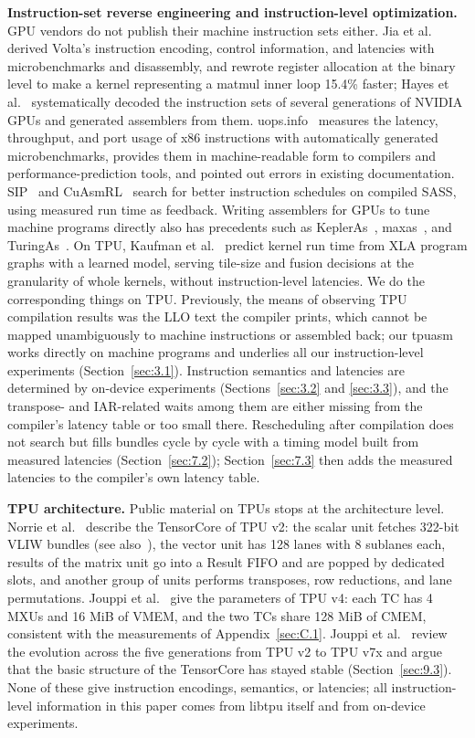 \documentclass[sigconf,nonacm,balance=false]{acmart}
\begin{document}
\textbf{Instruction-set reverse engineering and instruction-level optimization.} GPU vendors do not publish their machine instruction sets either. Jia et al.~\cite{jia2018volta} derived Volta's instruction encoding, control information, and latencies with microbenchmarks and disassembly, and rewrote register allocation at the binary level to make a kernel representing a matmul inner loop 15.4\% faster; Hayes et al.~\cite{hayes2019decoding} systematically decoded the instruction sets of several generations of NVIDIA GPUs and generated assemblers from them. uops.info~\cite{abel2019uops} measures the latency, throughput, and port usage of x86 instructions with automatically generated microbenchmarks, provides them in machine-readable form to compilers and performance-prediction tools, and pointed out errors in existing documentation. SIP~\cite{he2024sip} and CuAsmRL~\cite{he2025cuasmrl} search for better instruction schedules on compiled SASS, using measured run time as feedback. Writing assemblers for GPUs to tune machine programs directly also has precedents such as KeplerAs~\cite{zhang2017kepleras}, maxas~\cite{maxas}, and TuringAs~\cite{turingas}. On TPU, Kaufman et al.~\cite{kaufman2021} predict kernel run time from XLA program graphs with a learned model, serving tile-size and fusion decisions at the granularity of whole kernels, without instruction-level latencies. We do the corresponding things on TPU. Previously, the means of observing TPU compilation results was the LLO text the compiler prints, which cannot be mapped unambiguously to machine instructions or assembled back; our tpuasm~\cite{tpuasm} works directly on machine programs and underlies all our instruction-level experiments (Section~\ref{sec:3.1}). Instruction semantics and latencies are determined by on-device experiments (Sections~\ref{sec:3.2} and \ref{sec:3.3}), and the transpose- and IAR-related waits among them are either missing from the compiler's latency table or too small there. Rescheduling after compilation does not search but fills bundles cycle by cycle with a timing model built from measured latencies (Section~\ref{sec:7.2}); Section~\ref{sec:7.3} then adds the measured latencies to the compiler's own latency table.

\textbf{TPU architecture.} Public material on TPUs stops at the architecture level. Norrie et al.~\cite{norrie2021tpuv2} describe the TensorCore of TPU v2: the scalar unit fetches 322-bit VLIW bundles (see also~\cite{jouppi2026ironwood}), the vector unit has 128 lanes with 8 sublanes each, results of the matrix unit go into a Result FIFO and are popped by dedicated slots, and another group of units performs transposes, row reductions, and lane permutations. Jouppi et al.~\cite{jouppi2023tpuv4} give the parameters of TPU v4: each TC has 4 MXUs and 16 MiB of VMEM, and the two TCs share 128 MiB of CMEM, consistent with the measurements of Appendix~\ref{sec:C.1}. Jouppi et al.~\cite{jouppi2026ironwood} review the evolution across the five generations from TPU v2 to TPU v7x and argue that the basic structure of the TensorCore has stayed stable (Section~\ref{sec:9.3}). None of these give instruction encodings, semantics, or latencies; all instruction-level information in this paper comes from libtpu itself and from on-device experiments.
\end{document}
